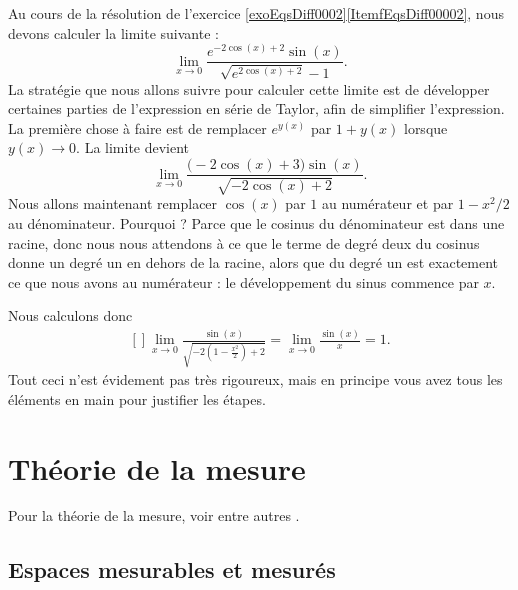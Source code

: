 Au cours de la résolution de l'exercice \ref{exoEqsDiff0002}\ref{ItemfEqsDiff00002}, nous devons calculer la limite suivante :
\begin{equation}
	\lim_{x\to 0} \frac{  e^{-2\cos(x)+2}\sin(x) }{ \sqrt{ e^{2\cos(x)+2}}-1 }.
\end{equation}
La stratégie que nous allons suivre pour calculer cette limite est de développer certaines parties de l'expression en série de Taylor, afin de simplifier l'expression. La première chose à faire est de remplacer $ e^{y(x)}$ par $1+y(x)$ lorsque $y(x)\to 0$. La limite devient
\begin{equation}
	\lim_{x\to 0} \frac{ \big( -2\cos(x)+3 \big)\sin(x) }{ \sqrt{-2\cos(x)+2} }.
\end{equation}
Nous allons maintenant remplacer $\cos(x)$ par $1$ au numérateur et par $1-x^2/2$ au dénominateur. Pourquoi ? Parce que le cosinus du dénominateur est dans une racine, donc nous nous attendons à ce que le terme de degré deux du cosinus donne un degré un en dehors de la racine, alors que du degré un est exactement ce que nous avons au numérateur : le développement du sinus commence par $x$.

Nous calculons donc
\begin{equation}
	\begin{aligned}[]
		\lim_{x\to 0} \frac{ \sin(x) }{ \sqrt{-2\left( 1-\frac{ x^2 }{ 2 } \right)+2} }=\lim_{x\to 0} \frac{ \sin(x) }{ x }=1.
	\end{aligned}
\end{equation}
Tout ceci n'est évidement pas très rigoureux, mais en principe vous avez tous les éléments en main pour justifier les étapes.

\section{Théorie de la mesure}

Pour la théorie de la mesure, voir entre autres \cite{FubiniBMauray,ProbaDanielLi}.

\subsection{Espaces mesurables et mesurés}

